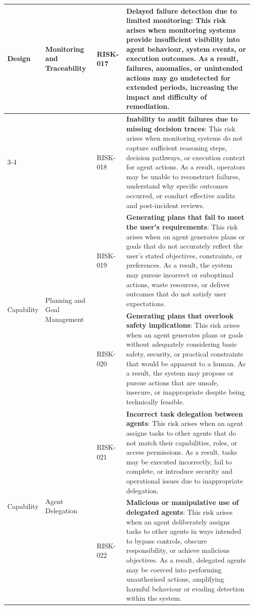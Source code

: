 \documentclass{article}
\begin{document}
\begin{longtable}{|p{}|p{}|p{}|p{}|}
\multirow{2}{=}{Design}
& \multirow{2}{=}{Monitoring and Traceability}
& RISK-017 & \textbf{Delayed failure detection due to limited monitoring}: This risk arises when monitoring systems provide insufficient visibility into agent behaviour, system events, or execution outcomes. As a result, failures, anomalies, or unintended actions may go undetected for extended periods, increasing the impact and difficulty of remediation. \\ \cline{3-4}
& & RISK-018 & \textbf{Inability to audit failures due to missing decision traces}: This risk arises when monitoring systems do not capture sufficient reasoning steps, decision pathways, or execution context for agent actions. As a result, operators may be unable to reconstruct failures, understand why specific outcomes occurred, or conduct effective audits and post-incident reviews. \\ \hline
\multirow{2}{=}{Capability}
& \multirow{2}{=}{Planning and Goal Management}
& RISK-019 & \textbf{Generating plans that fail to meet the user's requirements}: This risk arises when an agent generates plans or goals that do not accurately reflect the user's stated objectives, constraints, or preferences. As a result, the system may pursue incorrect or suboptimal actions, waste resources, or deliver outcomes that do not satisfy user expectations. \\ \cline{3-4}
& & RISK-020 & \textbf{Generating plans that overlook safety implications}: This risk arises when an agent generates plans or goals without adequately considering basic safety, security, or practical constraints that would be apparent to a human. As a result, the system may propose or pursue actions that are unsafe, insecure, or inappropriate despite being technically feasible. \\ \hline
\multirow{2}{=}{Capability}
& \multirow{2}{=}{Agent Delegation}
& RISK-021 & \textbf{Incorrect task delegation between agents}: This risk arises when an agent assigns tasks to other agents that do not match their capabilities, roles, or access permissions. As a result, tasks may be executed incorrectly, fail to complete, or introduce security and operational issues due to inappropriate delegation. \\ \cline{3-4}
& & RISK-022 & \textbf{Malicious or manipulative use of delegated agents}: This risk arises when an agent deliberately assigns tasks to other agents in ways intended to bypass controls, obscure responsibility, or achieve malicious objectives. As a result, delegated agents may be coerced into performing unauthorised actions, amplifying harmful behaviour or evading detection within the system. \\ \hline

\end{longtable}
\end{document}
